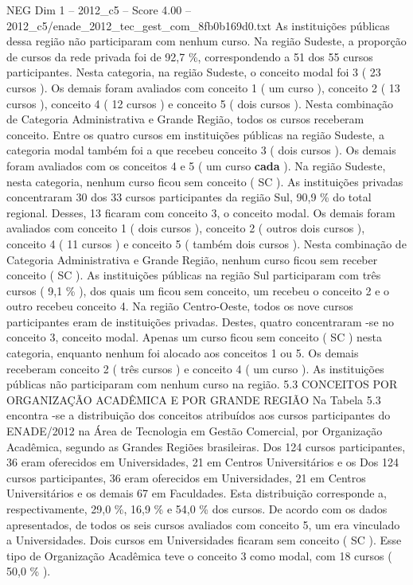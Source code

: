 \begin{textsample}{NEG Dim 1 – 2012\_c5 – Score 4.00 – 2012\_c5/enade\_2012\_tec\_gest\_com\_8fb0b169d0.txt}
As instituições públicas dessa região não participaram com nenhum curso.
Na região Sudeste, a proporção de cursos da rede privada foi de 92,7 \%, correspondendo a 51 dos 55 cursos participantes.
Nesta categoria, na região Sudeste, o conceito modal foi 3 ( 23 cursos ).
Os demais foram avaliados com conceito 1 ( um curso ), conceito 2 ( 13 cursos ), conceito 4 ( 12 cursos ) e conceito 5 ( dois cursos ).
Nesta combinação de Categoria Administrativa e Grande Região, todos os cursos receberam conceito.
Entre os quatro cursos em instituições públicas na região Sudeste, a categoria modal também foi a que recebeu conceito 3 ( dois cursos ).
Os demais foram avaliados com os conceitos 4 e 5 ( um curso \textbf{cada} ).
Na região Sudeste, nesta categoria, nenhum curso ficou sem conceito ( SC ).
As instituições privadas concentraram 30 dos 33 cursos participantes da região Sul, 90,9 \% do total regional.
Desses, 13 ficaram com conceito 3, o conceito modal.
Os demais foram avaliados com conceito 1 ( dois cursos ), conceito 2 ( outros dois cursos ), conceito 4 ( 11 cursos ) e conceito 5 ( também dois cursos ).
Nesta combinação de Categoria Administrativa e Grande Região, nenhum curso ficou sem receber conceito ( SC ).
As instituições públicas na região Sul participaram com três cursos ( 9,1 \% ), dos quais um ficou sem conceito, um recebeu o conceito 2 e o outro recebeu conceito 4.
Na região Centro-Oeste, todos os nove cursos participantes eram de instituições privadas.
Destes, quatro concentraram -se no conceito 3, conceito modal.
Apenas um curso ficou sem conceito ( SC ) nesta categoria, enquanto nenhum foi alocado aos conceitos 1 ou 5.
Os demais receberam conceito 2 ( três cursos ) e conceito 4 ( um curso ).
As instituições públicas não participaram com nenhum curso na região. 5.3 CONCEITOS POR ORGANIZAÇÃO ACADÊMICA E POR GRANDE REGIÃO Na Tabela 5.3 encontra -se a distribuição dos conceitos atribuídos aos cursos participantes do ENADE/2012 na Área de Tecnologia em Gestão Comercial, por Organização Acadêmica, segundo as Grandes Regiões brasileiras.
Dos 124 cursos participantes, 36 eram oferecidos em Universidades, 21 em Centros Universitários e os Dos 124 cursos participantes, 36 eram oferecidos em Universidades, 21 em Centros Universitários e os demais 67 em Faculdades.
Esta distribuição corresponde a, respectivamente, 29,0 \%, 16,9 \% e 54,0 \% dos cursos.
De acordo com os dados apresentados, de todos os seis cursos avaliados com conceito 5, um era vinculado a Universidades.
Dois cursos em Universidades ficaram sem conceito ( SC ).
Esse tipo de Organização Acadêmica teve o conceito 3 como modal, com 18 cursos ( 50,0 \% ).

\end{textsample}

